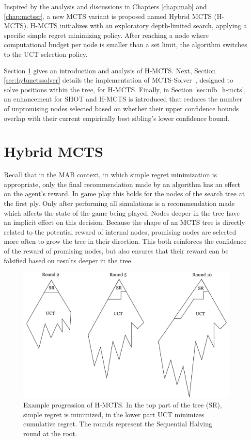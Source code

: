 \documentclass{kecsmstr}
\begin{document}
Inspired by the analysis and discussions in Chapters \ref{chap:mab} and \ref{chap:mctssr}, a new MCTS variant is proposed named Hybrid MCTS (H-MCTS). H-MCTS initializes with an exploratory depth-limited search, applying a specific simple regret minimizing policy. After reaching a node where computational budget per node is smaller than a set limit, the algorithm switches to the UCT selection policy. 
\vspace{2 mm}

Section \ref{sec:hybmcts} gives an introduction and analysis of H-MCTS. Next, Section \ref{sec:hybmctssolver} details the implementation of MCTS-Solver~, designed to solve positions within the tree, for H-MCTS. Finally, in Section \ref{sec:ulb_h-mcts}, an enhancement for SHOT and H-MCTS is introduced that reduces the number of unpromising nodes selected based on whether their upper confidence bounds overlap with their current empirically best sibling's lower confidence bound.
\newpage
\section{Hybrid MCTS}
\label{sec:hybmcts}

Recall that in the MAB context, in which simple regret minimization is appropriate, only the final recommendation made by an algorithm has an effect on the agent's reward. In game play this holds for the nodes of the search tree at the first ply. Only after performing all simulations is a recommendation made which affects the state of the game being played. Nodes deeper in the tree have an implicit effect on this decision. Because the shape of an MCTS tree is directly related to the potential reward of internal nodes, promising nodes are selected more often to grow the tree in their direction. This both reinforces the confidence of the reward of promising nodes, but also ensures that their reward can be falsified based on results deeper in the tree.

\begin{figure}[ht]
	\centering
	\includegraphics[width=.75\textwidth]{img/H-MCTS.png}
	\caption[Hybrid MCTS tree progression]{Example progression of H-MCTS. In the top part of the tree (SR), simple regret is minimized, in the lower part UCT minimizes cumulative regret. The rounds represent the Sequential Halving round at the root.}
	\label{fig:h-mcts_trees}
\end{figure}
\end{document}
